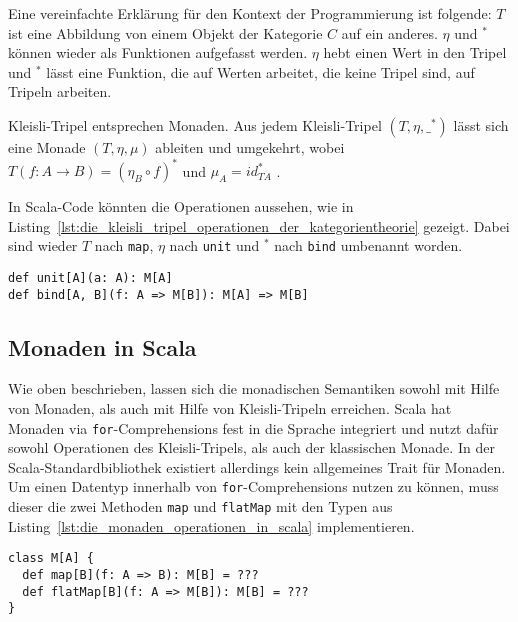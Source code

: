 Eine vereinfachte Erklärung für den Kontext der Programmierung ist folgende:
$T$ ist eine Abbildung von einem Objekt der Kategorie $C$ auf ein anderes.
$\eta$ und $^*$ können wieder als Funktionen aufgefasst werden.
$\eta$ hebt einen Wert in den Tripel und $^*$ lässt eine Funktion, die auf Werten arbeitet, die keine Tripel sind, auf Tripeln arbeiten.

Kleisli-Tripel entsprechen Monaden.
Aus jedem Kleisli-Tripel $(T, \eta, \_^*)$ lässt sich eine Monade $(T, \eta, \mu)$ ableiten und umgekehrt, wobei $T(f: A \to B) = (\eta_B \circ f)^*$ und $\mu_A = id^*_{T A}$ \cite[vgl.][S.~2]{monads_program_structure}.

In Scala-Code könnten die Operationen aussehen, wie in Listing~\ref{lst:die_kleisli_tripel_operationen_der_kategorientheorie} gezeigt.
Dabei sind wieder $T$ nach \lstinline|map|, $\eta$ nach \lstinline|unit| und $^*$ nach \lstinline|bind| umbenannt worden.

\begin{lstlisting}[caption=Die Kleisli-Tripel-Operationen der Kategorientheorie, label=lst:die_kleisli_tripel_operationen_der_kategorientheorie]
def unit[A](a: A): M[A]
def bind[A, B](f: A => M[B]): M[A] => M[B]
\end{lstlisting}


\subsection{Monaden in Scala} %
\label{sub:monaden_in_der_programmierung}

Wie oben beschrieben, lassen sich die monadischen Semantiken sowohl mit Hilfe von Monaden, als auch mit Hilfe von Kleisli-Tripeln erreichen.
Scala hat Monaden via \lstinline|for|-Comprehensions fest in die Sprache integriert und nutzt dafür sowohl Operationen des Kleisli-Tripels, als auch der klassischen Monade.
In der Scala-Standardbibliothek existiert allerdings kein allgemeines Trait für Monaden.
Um einen Datentyp innerhalb von \lstinline|for|-Comprehensions nutzen zu können, muss dieser die zwei Methoden \lstinline|map| und \lstinline|flatMap| mit den Typen aus Listing~\ref{lst:die_monaden_operationen_in_scala} implementieren.

\begin{lstlisting}[caption=Die Monaden-Operationen in Scala, label=lst:die_monaden_operationen_in_scala]
class M[A] {
  def map[B](f: A => B): M[B] = ???
  def flatMap[B](f: A => M[B]): M[B] = ???
}
\end{lstlisting}

